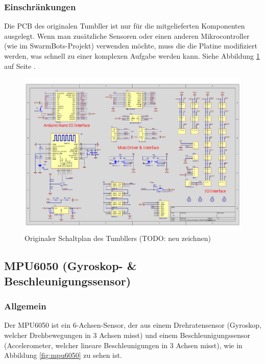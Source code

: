\subsubsection{Einschränkungen}
Die PCB des originalen Tumbller ist nur für die mitgelieferten Komponenten ausgelegt.
%
Wenn man zusätzliche Sensoren oder einen anderen Mikrocontroller (wie im SwarmBots-Projekt) verwenden möchte,
muss die die Platine modifiziert werden,
was schnell zu einer komplexen Aufgabe werden kann.
%
Siehe Abbildung \ref{fig:elegoo_tumbller_original_circuit} auf Seite \pageref{fig:elegoo_tumbller_original_circuit}.
%
\begin{figure}
    \includegraphics[width=\textwidth, center]{img/elegoo_tumbller_original_circuit.pdf}
    \caption{Originaler Schaltplan des Tumbllers (TODO: neu zeichnen)}
    \label{fig:elegoo_tumbller_original_circuit}
\end{figure}
%
\newpage
\subsection{MPU6050 (Gyroskop- \& Beschleunigungssensor)}
%
\subsubsection{Allgemein}
Der MPU6050 ist ein 6-Achsen-Sensor,
der aus einem Drehratensensor (Gyroskop, welcher Drehbewegungen in 3 Achsen misst)
und einem Beschleunigungssensor (Accelerometer, welcher lineare Beschleunigungen in 3 Achsen misst),
wie in Abbildung \ref{fig:mpu6050} zu sehen ist.
